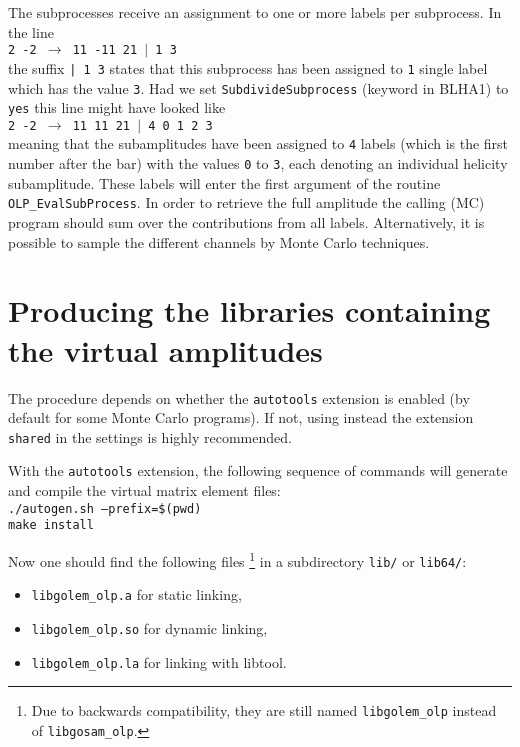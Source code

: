 The subprocesses receive an assignment to one or more
labels per subprocess. In the line\\
{\tt 2 -2 $\to$ 11 -11 21 $|$ 1 3}\\
the suffix \texttt{| 1 3}
states that this subprocess has been assigned to \texttt{1}
single label which has the value \texttt{3}. 
Had we set \texttt{SubdivideSubprocess} (keyword in BLHA1)
to \texttt{yes} this line might have looked like\\
{\tt 2 -2 $\to$ 11 11 21 $|$ 4 0 1 2 3}\\
meaning that the subamplitudes
have been assigned to
\texttt{4} labels (which is the first number after the bar) with
the values \texttt{0} to \texttt{3}, each denoting 
an individual helicity subamplitude. These labels will enter the
first argument of the routine \texttt{OLP\_EvalSubProcess}.
In order to retrieve the full amplitude the calling (MC) program should sum
over the contributions from all labels. Alternatively, it is possible to
sample the different channels by Monte Carlo techniques.

\section{Producing the libraries containing the virtual amplitudes}

The procedure depends on whether the \texttt{autotools} extension is enabled
(by default for some Monte Carlo programs). 
If not, using instead the extension \texttt{shared} 
in the \gosam{} settings is highly recommended.

With the \texttt{autotools} extension, the following sequence of commands will generate
and compile the virtual matrix element files:\\
{\tt ./autogen.sh --prefix=\$(pwd)}\\
{\tt make install}

Now one should find the following files%
\footnote{Due to backwards compatibility, they are still named \texttt{libgolem\_olp} instead of \texttt{libgosam\_olp}.}
in a subdirectory \texttt{lib/} or \texttt{lib64/}:
\begin{itemize}
\item \texttt{libgolem\_olp.a} for static linking,
\item \texttt{libgolem\_olp.so} for dynamic linking,
\item \texttt{libgolem\_olp.la} for linking with libtool.
\end{itemize}

